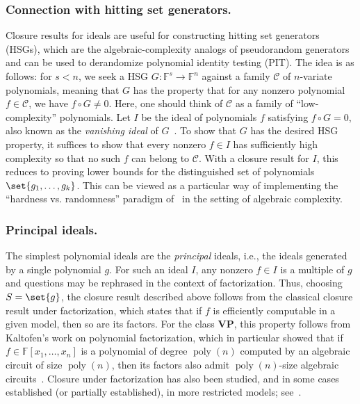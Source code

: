 \documentclass[10pt,a4paper]{amsart}
\newcommand*\ie{i.e.}
\DeclareMathOperator{\poly}{poly}
\newcommand*\F{\mathbb{F}}
\begin{document}
\subsubsection*{Connection with hitting set generators.} 

Closure results for ideals are useful for constructing hitting set generators (HSGs), which are the algebraic-complexity analogs of pseudorandom generators and can be used to derandomize polynomial identity testing (PIT).
The idea is as follows: for $s < n$, we seek a HSG $G\colon \F^s \to \F^n$ against a family $\mathcal{C}$ of $n$-variate polynomials, meaning that $G$ has the property that for any nonzero polynomial $f \in \mathcal{C}$, we have $f \circ G \neq 0$.
Here, one should think of $\mathcal{C}$ as a family of ``low-complexity'' polynomials.
Let $I$ be the ideal of polynomials $f$ satisfying $f \circ G = 0$, also known as the \emph{vanishing ideal} of $G$~\cite{HvMM24}.
To show that $G$ has the desired HSG property, it suffices to show that every nonzero $f \in I$ has sufficiently high complexity so that no such $f$ can belong to $\mathcal{C}$.
With a closure result for $I$, this reduces to proving lower bounds for the distinguished set of polynomials $\set{g_1, \dots, g_k}$.
This can be viewed as a particular way of implementing the ``hardness vs. randomness'' paradigm of~\cite{NW94} in the setting of algebraic complexity.

\subsubsection*{Principal ideals.}  

The simplest polynomial ideals are the \emph{principal} ideals, \ie, the ideals generated by a single polynomial $g$.  
For such an ideal $I$, any nonzero $f \in I$ is a multiple of $g$ and questions may be rephrased in the context of factorization.
Thus, choosing $S = \set{g}$, the closure result described above follows from the classical closure result under factorization, which states that if $f$ is efficiently computable in a given model, then so are its factors.
For the class $\mathbf{VP}$, this property follows from Kaltofen’s work on polynomial factorization, which in particular showed that if $f \in \F[x_1,\dots,x_n]$ is a polynomial of degree $\poly(n)$ computed by an algebraic circuit of size $\poly(n)$, then its factors also admit $\poly(n)$-size algebraic circuits~\cite{Kal86, Kal87, Kal89}.  
Closure under factorization has also been studied, and in some cases established (or partially established), in more restricted models; see~\cite{Oli16,CKS19,BSV20,ST21,DSS22,BKRRSS25}.
\end{document}
